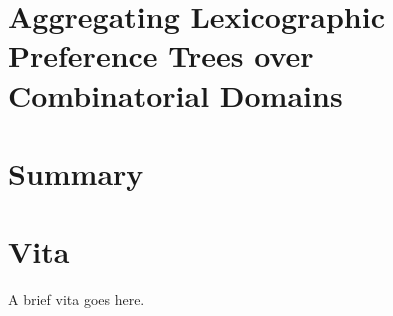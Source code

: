\documentclass[final]{ukthesis}
\begin{document}
\chapter{Aggregating Lexicographic Preference Trees over Combinatorial Domains}

\copyrightnotice

\chapter{Summary}

\copyrightnotice


\backmatter



\chapter{Vita}
A brief vita goes here.
\end{document}
